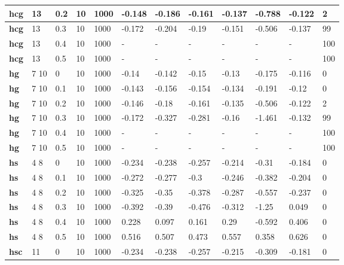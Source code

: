 \begin{longtable}[h]{|p{0.8cm}|p{1.5cm}|p{1cm}|p{1cm}|p{1cm}|p{1cm}|p{1cm}|p{1cm}|p{1cm}|p{1cm}|p{1cm}|p{1.5cm}|}
    \\ \hline
  \textbf{hcg } &  13         & 0.2 & 10 & 1000 & -0.148 & -0.186 & -0.161 & -0.137 & -0.788 & -0.122 &   2
    \\ \hline
  \textbf{hcg } &  13         & 0.3 & 10 & 1000 & -0.172 & -0.204 &  -0.19 & -0.151 & -0.506 & -0.137 &  99
    \\ \hline
  \textbf{hcg } &  13         & 0.4 & 10 & 1000 & - & - & - & - & - & - & 100
    \\ \hline
  \textbf{hcg } &  13         & 0.5 & 10 & 1000 & - & - & - & - & - & - & 100
    \\ \hline
  \textbf{hg  } &  7 10       &   0 & 10 & 1000 &  -0.14 & -0.142 &  -0.15 &  -0.13 & -0.175 & -0.116 &   0
    \\ \hline
  \textbf{hg  } &  7 10       & 0.1 & 10 & 1000 & -0.143 & -0.156 & -0.154 & -0.134 & -0.191 &  -0.12 &   0
    \\ \hline
  \textbf{hg  } &  7 10       & 0.2 & 10 & 1000 & -0.146 &  -0.18 & -0.161 & -0.135 & -0.506 & -0.122 &   2
    \\ \hline
  \textbf{hg  } &  7 10       & 0.3 & 10 & 1000 & -0.172 & -0.327 & -0.281 &  -0.16 & -1.461 & -0.132 &  99
    \\ \hline
  \textbf{hg  } &  7 10       & 0.4 & 10 & 1000 & - & - & - & - & - & - & 100
    \\ \hline
  \textbf{hg  } &  7 10       & 0.5 & 10 & 1000 & - & - & - & - & - & - & 100
    \\ \hline
  \textbf{hs  } &  4 8        &   0 & 10 & 1000 & -0.234 & -0.238 & -0.257 & -0.214 &  -0.31 & -0.184 &   0
    \\ \hline
  \textbf{hs  } &  4 8        & 0.1 & 10 & 1000 & -0.272 & -0.277 &   -0.3 & -0.246 & -0.382 & -0.204 &   0
    \\ \hline
  \textbf{hs  } &  4 8        & 0.2 & 10 & 1000 & -0.325 &  -0.35 & -0.378 & -0.287 & -0.557 & -0.237 &   0
    \\ \hline
  \textbf{hs  } &  4 8        & 0.3 & 10 & 1000 & -0.392 &  -0.39 & -0.476 & -0.312 &  -1.25 &  0.049 &   0
    \\ \hline
  \textbf{hs  } &  4 8        & 0.4 & 10 & 1000 &  0.228 &  0.097 &  0.161 &   0.29 & -0.592 &  0.406 &   0
    \\ \hline
  \textbf{hs  } &  4 8        & 0.5 & 10 & 1000 &  0.516 &  0.507 &  0.473 &  0.557 &  0.358 &  0.626 &   0
    \\ \hline
  \textbf{hsc } &  11         &   0 & 10 & 1000 & -0.234 & -0.238 & -0.257 & -0.215 & -0.309 & -0.181 &   0

\end{longtable}
